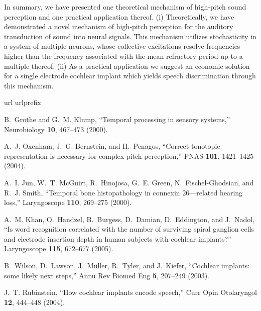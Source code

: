 \documentclass[prl,preprint,amsfonts,showpacs,showkeys]{revtex4}
\begin{document}
In summary, we have presented one theoretical mechanism of high-pitch sound perception
and one practical application thereof.
(i) Theoretically,  we have demonstrated a novel mechanism of high-pitch perception for the auditory transduction of sound into neural signals.
This mechanism utilizes stochasticity in a system of multiple neurons,
whose collective excitations resolve frequencies higher than the frequency
associated with the mean refractory period up to a multiple thereof.
(ii) As a practical application we suggest an economic solution for a single electrode cochlear implant
which yields speech discrimination through this mechanism.


%
%
%
%
%


\begin{thebibliography}{10}
\newcommand{\enquote}[1]{``#1''}
\expandafter\ifx\csname url\endcsname\relax
  \def\url#1{\texttt{#1}}\fi
\expandafter\ifx\csname urlprefix\endcsname\relax\def\urlprefix{URL }\fi
\providecommand{\eprint}[2][]{\url{#2}}

B.~Grothe and G.~M. Klump, \enquote{Temporal processing in sensory systems,}
  Neurobiology \textbf{10}, 467--473 (2000).

A.~J. Oxenham, J.~G. Bernstein, and H.~Penagos, \enquote{Correct tonotopic
  representation is necessary for complex pitch perception,} PNAS \textbf{101},
  1421--1425 (2004).

A.~I. Jun, W.~T. McGuirt, R.~Hinojosa, G.~E. Green, N.~Fischel-Ghodsian, and
  R.~J. Smith, \enquote{Temporal bone histopathology in connexin 26---related
  hearing loss,} Laryngoscope \textbf{110}, 269--275 (2000).

A.~M. Khan, O.~Handzel, B.~Burgess, D.~Damian, D.~Eddington, and J.~Nadol,
  \enquote{Is word recognition correlated with the number of surviving spiral
  ganglion cells and electrode insertion depth in human subjects with cochlear
  implants?} Laryngoscope \textbf{115}, 672--677 (2005).

B.~Wilson, D.~Lawson, J.~M{\"{u}}ller, R.~Tyler, and J.~Kiefer,
  \enquote{Cochlear implants: some likely next steps,} Annu Rev Biomed Eng
  \textbf{5}, 207--249 (2003).

J.~T. Rubinstein, \enquote{How cochlear implants encode speech,} Curr Opin
  Otolaryngol \textbf{12}, 444--448 (2004).


\end{thebibliography}
\end{document}
